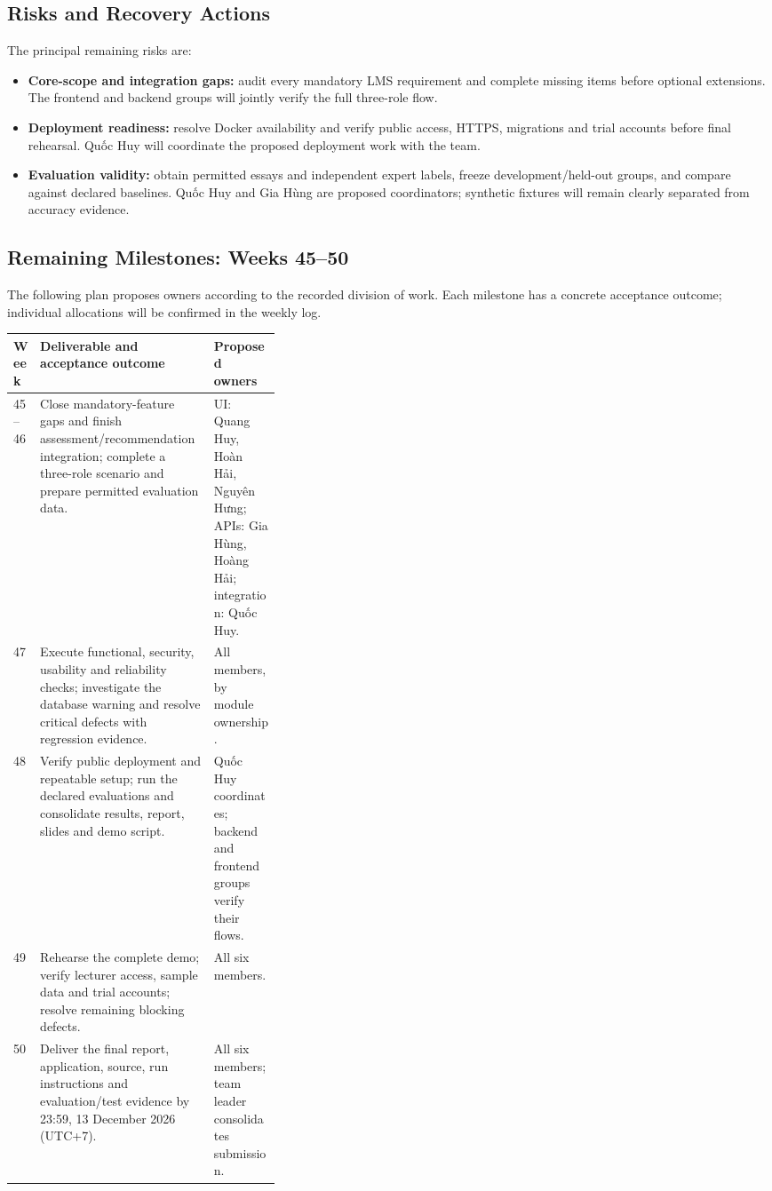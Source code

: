 \subsection{Risks and Recovery Actions}
The principal remaining risks are:
\begin{itemize}
  \item \textbf{Core-scope and integration gaps:} audit every mandatory LMS
  requirement and complete missing items before optional extensions.
  The frontend and backend groups will jointly verify the full three-role flow.
  \item \textbf{Deployment readiness:} resolve Docker availability and verify
  public access, HTTPS, migrations and trial accounts before final rehearsal.
  Quốc Huy will coordinate the proposed deployment work with the team.
  \item \textbf{Evaluation validity:} obtain permitted essays and independent
  expert labels, freeze development/held-out groups, and compare against
  declared baselines. Quốc Huy and Gia Hùng are proposed coordinators;
  synthetic fixtures will remain clearly separated from accuracy evidence.
\end{itemize}

\subsection{Remaining Milestones: Weeks 45--50}
The following plan proposes owners according to the recorded division of work.
Each milestone has a concrete acceptance outcome; individual allocations will
be confirmed in the weekly log.

\begin{center}
\begingroup
\small
\begin{tabularx}{\linewidth}{@{}p{0.10\linewidth}Xp{0.25\linewidth}@{}}
\toprule
\textbf{Week} & \textbf{Deliverable and acceptance outcome} & \textbf{Proposed owners} \\
\midrule
45--46 & Close mandatory-feature gaps and finish assessment/recommendation integration; complete a three-role scenario and prepare permitted evaluation data. & UI: Quang Huy, Hoàn Hải, Nguyên Hưng; APIs: Gia Hùng, Hoàng Hải; integration: Quốc Huy. \\
47 & Execute functional, security, usability and reliability checks; investigate the database warning and resolve critical defects with regression evidence. & All members, by module ownership. \\
48 & Verify public deployment and repeatable setup; run the declared evaluations and consolidate results, report, slides and demo script. & Quốc Huy coordinates; backend and frontend groups verify their flows. \\
49 & Rehearse the complete demo; verify lecturer access, sample data and trial accounts; resolve remaining blocking defects. & All six members. \\
50 & Deliver the final report, application, source, run instructions and evaluation/test evidence by 23:59, 13 December 2026 (UTC+7). & All six members; team leader consolidates submission. \\
\bottomrule
\end{tabularx}
\endgroup
\end{center}

